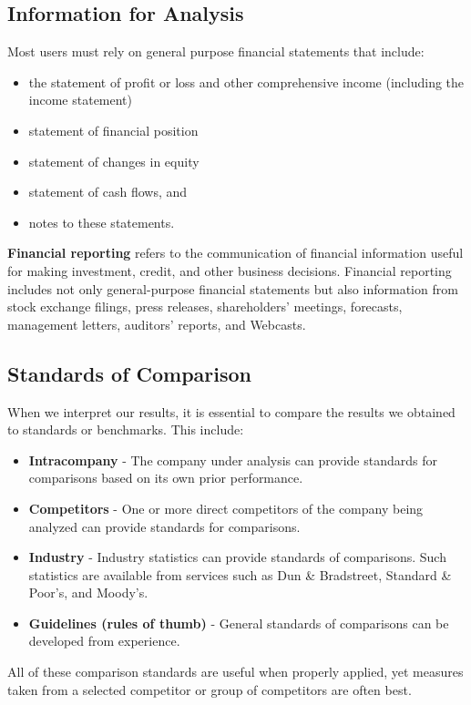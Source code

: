 \documentclass[../main.tex]{subfiles}
\begin{document}
	\subsection{Information for Analysis}
	
	Most users must rely on general purpose financial statements that include:
	\begin{itemize}
		\item the statement of profit or loss and other comprehensive income 
		(including the income statement)
		\item statement of financial position
		\item statement of changes in equity
		\item statement of cash flows, and
		\item notes to these statements.
	\end{itemize}

	\textbf{Financial reporting} refers to the communication of financial 
	information useful for making investment, credit, and other business 
	decisions. Financial reporting includes not only general-purpose financial 
	statements but also information from stock exchange filings, press 
	releases, shareholders’ meetings, forecasts, management letters, auditors’ 
	reports, and Webcasts.
	
	\subsection{Standards of Comparison}
	
	When we interpret our results, it is essential to compare the results we 
	obtained to standards or benchmarks. This include:
	\begin{itemize}[noitemsep]
		\item \textbf{Intracompany} - The company under analysis can provide 
		standards for comparisons based on its own prior performance.
		\item \textbf{Competitors} - One or more direct competitors of the 
		company being analyzed can provide standards for comparisons. 
		\item \textbf{Industry} - Industry statistics can provide standards of 
		comparisons. Such statistics are available from services such as Dun \& 
		Bradstreet, Standard \& Poor’s, and Moody’s.
		\item \textbf{Guidelines (rules of thumb)} - General standards of 
		comparisons can be developed from experience.
	\end{itemize}
	All of these comparison standards are useful when properly applied, yet 
	measures taken from a selected competitor or group of competitors are often 
	best.
\end{document}

